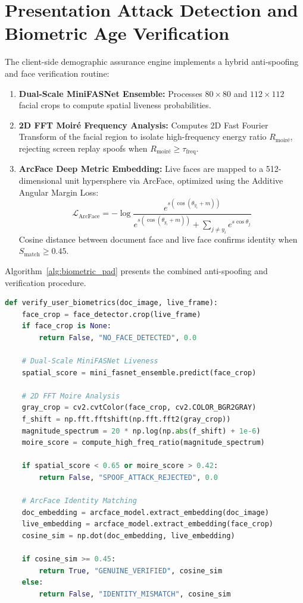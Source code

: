 \documentclass[12pt,a4paper]{report}
\begin{document}
\section{Presentation Attack Detection and Biometric Age Verification}
The client-side demographic assurance engine implements a hybrid anti-spoofing and face verification routine:
\begin{enumerate}
    \item \textbf{Dual-Scale MiniFASNet Ensemble:} Processes $80 \times 80$ and $112 \times 112$ facial crops to compute spatial liveness probabilities.
    \item \textbf{2D FFT Moir\'{e} Frequency Analysis:} Computes 2D Fast Fourier Transform of the facial region to isolate high-frequency energy ratio $R_{\text{moir\'{e}}}$, rejecting screen replay spoofs when $R_{\text{moir\'{e}}} \ge \tau_{\text{freq}}$.
    \item \textbf{ArcFace Deep Metric Embedding:} Live faces are mapped to a 512-dimensional unit hypersphere via ArcFace, optimized using the Additive Angular Margin Loss:
    \begin{equation}
    \mathcal{L}_{\text{ArcFace}} = -\log \frac{e^{s \left( \cos(\theta_{y_i} + m) \right)}}{e^{s \left( \cos(\theta_{y_i} + m) \right)} + \sum_{j \neq y_i} e^{s \cos \theta_j}}
    \end{equation}
    Cosine distance between document face and live face confirms identity when $S_{\text{match}} \ge 0.45$.
\end{enumerate}

Algorithm~\ref{alg:biometric_pad} presents the combined anti-spoofing and verification procedure.

\begin{lstlisting}[language=Python, caption={Hybrid Biometric PAD and Identity Verification Routine}, label={alg:biometric_pad}]
def verify_user_biometrics(doc_image, live_frame):
    face_crop = face_detector.crop(live_frame)
    if face_crop is None:
        return False, "NO_FACE_DETECTED", 0.0
    
    # Dual-Scale MiniFASNet Liveness
    spatial_score = mini_fasnet_ensemble.predict(face_crop)
    
    # 2D FFT Moire Analysis
    gray_crop = cv2.cvtColor(face_crop, cv2.COLOR_BGR2GRAY)
    f_shift = np.fft.fftshift(np.fft.fft2(gray_crop))
    magnitude_spectrum = 20 * np.log(np.abs(f_shift) + 1e-6)
    moire_score = compute_high_freq_ratio(magnitude_spectrum)
    
    if spatial_score < 0.65 or moire_score > 0.42:
        return False, "SPOOF_ATTACK_REJECTED", 0.0
        
    # ArcFace Identity Matching
    doc_embedding = arcface_model.extract_embedding(doc_image)
    live_embedding = arcface_model.extract_embedding(face_crop)
    cosine_sim = np.dot(doc_embedding, live_embedding)
    
    if cosine_sim >= 0.45:
        return True, "GENUINE_VERIFIED", cosine_sim
    else:
        return False, "IDENTITY_MISMATCH", cosine_sim
\end{lstlisting}
\end{document}
